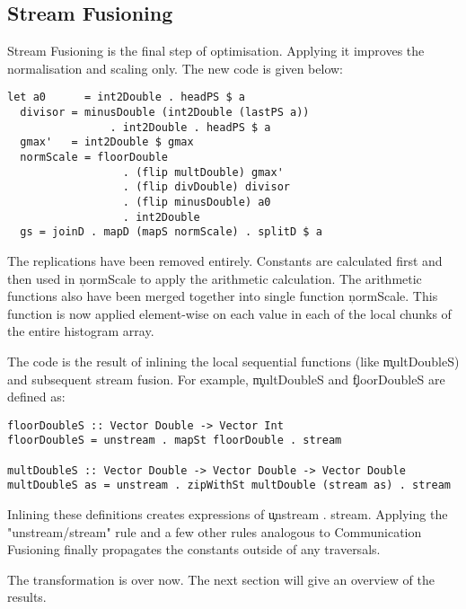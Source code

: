   \subsection{Stream Fusioning}
    Stream Fusioning is the final step of optimisation. Applying it improves
    the normalisation and scaling only. The new code is given below:
    \begin{lstlisting}
let a0      = int2Double . headPS $ a 
  divisor = minusDouble (int2Double (lastPS a))
                . int2Double . headPS $ a
  gmax'   = int2Double $ gmax
  normScale = floorDouble
                  . (flip multDouble) gmax'
                  . (flip divDouble) divisor
                  . (flip minusDouble) a0
                  . int2Double
  gs = joinD . mapD (mapS normScale) . splitD $ a
     \end{lstlisting}
     The replications have been removed entirely.
     Constants are calculated first and then used in \c{normScale}
     to apply the arithmetic calculation.
     The arithmetic functions also have been merged together into
     single function \c{normScale}. This function is now applied element-wise
     on each value in each of the local chunks of the entire histogram array.
     
     The code is the result of inlining the local sequential functions (like \c{multDoubleS})
     and subsequent stream fusion.
     For example, \c{multDoubleS} and \c{floorDoubleS} are defined as:
     \begin{lstlisting}
floorDoubleS :: Vector Double -> Vector Int
floorDoubleS = unstream . mapSt floorDouble . stream

multDoubleS :: Vector Double -> Vector Double -> Vector Double
multDoubleS as = unstream . zipWithSt multDouble (stream as) . stream
     \end{lstlisting}
     Inlining these definitions creates expressions of \c{unstream . stream}. Applying
     the "unstream/stream" rule and a few other rules analogous to
     Communication Fusioning finally propagates the constants outside
     of any traversals.
     
     The transformation is over now. The next section will give an overview of the results.
         
